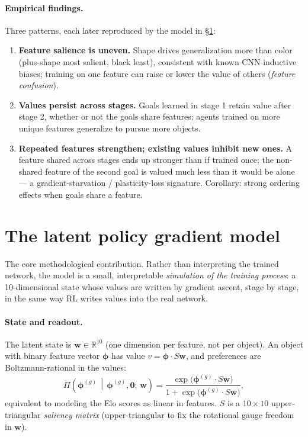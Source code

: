 \documentclass[11pt]{article}
\newcommand{\w}{\bm{w}}
\newcommand{\feat}{\bm{\phi}}
\begin{document}
\paragraph{Empirical findings.} Three patterns, each later reproduced by the model in \S\ref{sec:lpg}:
\begin{enumerate}
\item \textbf{Feature salience is uneven.} Shape drives generalization more than color (plus-shape most salient, black least), consistent with known CNN inductive biases; training on one feature can raise or lower the value of others (\emph{feature confusion}).
\item \textbf{Values persist across stages.} Goals learned in stage 1 retain value after stage 2, whether or not the goals share features; agents trained on more unique features generalize to pursue more objects.
\item \textbf{Repeated features strengthen; existing values inhibit new ones.} A feature shared across stages ends up stronger than if trained once; the non-shared feature of the second goal is valued much less than it would be alone --- a gradient-starvation / plasticity-loss signature. Corollary: strong ordering effects when goals share a feature.
\end{enumerate}

\section{The latent policy gradient model}
\label{sec:lpg}

The core methodological contribution. Rather than interpreting the trained network, the model is a small, interpretable \emph{simulation of the training process}: a 10-dimensional state whose values are written by gradient ascent, stage by stage, in the same way RL writes values into the real network.

\paragraph{State and readout.} The latent state is $\w \in \mathbb{R}^{10}$ (one dimension per feature, not per object). An object with binary feature vector $\feat$ has value $v = \feat \cdot S\w$, and preferences are Boltzmann-rational in the values:
\begin{equation}
\Pi\!\left(\feat^{(g)} \,\middle|\, \feat^{(g)}, \bm{0};\, \w\right) = \frac{\exp\!\big(\feat^{(g)} \cdot S\w\big)}{1 + \exp\!\big(\feat^{(g)} \cdot S\w\big)},
\end{equation}
equivalent to modeling the Elo scores as linear in features. $S$ is a $10\times10$ upper-triangular \emph{saliency matrix} (upper-triangular to fix the rotational gauge freedom in $\w$).
\end{document}
